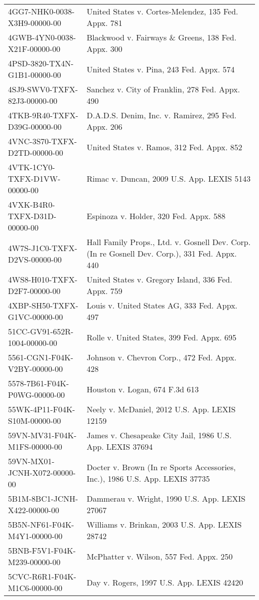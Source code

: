 \documentclass[10pt, letterpaper]{article}
\begin{document}
\begin{spacing}{1.0}
\begin{longtable}{p{2.5in}p{4in}}
    4GG7-NHK0-0038-X3H9-00000-00 & United States v. Cortes-Melendez, 135 Fed. Appx. 781\\
    4GWB-4YN0-0038-X21F-00000-00 & Blackwood v. Fairways \& Greens, 138 Fed. Appx. 300\\
    4PSD-3820-TX4N-G1B1-00000-00 & United States v. Pina, 243 Fed. Appx. 574\\
    4SJ9-SWV0-TXFX-82J3-00000-00 & Sanchez v. City of Franklin, 278 Fed. Appx. 490\\
    4TKB-9R40-TXFX-D39G-00000-00 & D.A.D.S. Denim, Inc. v. Ramirez, 295 Fed. Appx. 206\\
    4VNC-3S70-TXFX-D2TD-00000-00 & United States v. Ramos, 312 Fed. Appx. 852\\
    4VTK-1CY0-TXFX-D1VW-00000-00 & Rimac v. Duncan, 2009 U.S. App. LEXIS 5143\\
    4VXK-B4R0-TXFX-D31D-00000-00 & Espinoza v. Holder, 320 Fed. Appx. 588\\
    4W7S-J1C0-TXFX-D2VS-00000-00 & Hall Family Props., Ltd. v. Gosnell Dev. Corp. (In re Gosnell Dev. Corp.), 331 Fed. Appx. 440\\
    4WS8-H010-TXFX-D2F7-00000-00 & United States v. Gregory Island, 336 Fed. Appx. 759\\
    4XBP-SH50-TXFX-G1VC-00000-00 & Louis v. United States AG, 333 Fed. Appx. 497\\
    51CC-GV91-652R-1004-00000-00 & Rolle v. United States, 399 Fed. Appx. 695\\
    5561-CGN1-F04K-V2BY-00000-00 & Johnson v. Chevron Corp., 472 Fed. Appx. 428\\
    5578-7B61-F04K-P0WG-00000-00 & Houston v. Logan, 674 F.3d 613\\
    55WK-4P11-F04K-S10M-00000-00 & Neely v. McDaniel, 2012 U.S. App. LEXIS 12159\\
    59VN-MV31-F04K-M1FS-00000-00 & James v. Chesapeake City Jail, 1986 U.S. App. LEXIS 37694\\
    59VN-MX01-JCNH-X072-00000-00 & Docter v. Brown (In re Sports Accessories, Inc.), 1986 U.S. App. LEXIS 37735\\
    5B1M-8BC1-JCNH-X422-00000-00 & Dammerau v. Wright, 1990 U.S. App. LEXIS 27067\\
    5B5N-NF61-F04K-M4Y1-00000-00 & Williams v. Brinkan, 2003 U.S. App. LEXIS 28742\\
    5BNB-F5V1-F04K-M239-00000-00 & McPhatter v. Wilson, 557 Fed. Appx. 250\\
    5CVC-R6R1-F04K-M1C6-00000-00 & Day v. Rogers, 1997 U.S. App. LEXIS 42420\\

\end{longtable}
\end{spacing}
\end{document}
